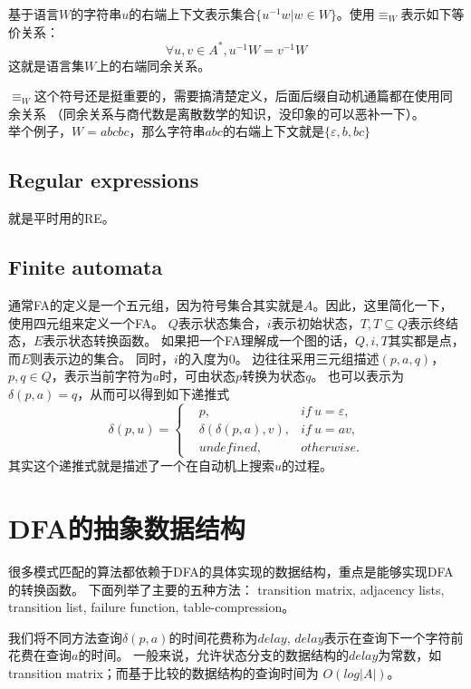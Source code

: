 \documentclass[UTF8]{ctexart}
\theoremstyle{definition}
\theoremstyle{remark}
\numberwithin{equation}{subsection}
\begin{document}
	基于语言$W$的字符串$u$的右端上下文表示集合$\{ u^{-1}w | w \in W \}$。使用$\equiv_W$表示如下等价关系：
	\[
		\forall u,v \in A^*, u^{-1} W = v^{-1} W
	\]
	这就是语言集$W$上的右端同余关系。
	
	$\equiv_W$这个符号还是挺重要的，需要搞清楚定义，后面后缀自动机通篇都在使用同余关系
	（同余关系与商代数是离散数学的知识，没印象的可以恶补一下）。	\\
	举个例子，$W = {abcbc}$，那么字符串$abc$的右端上下文就是$\{ \varepsilon, b, bc \}$
	
	
\subsection{Regular expressions}

	就是平时用的RE。
	
\subsection{Finite automata}
	
	通常FA的定义是一个五元组，因为符号集合其实就是$A$。因此，这里简化一下，使用四元组来定义一个FA。
	$Q$表示状态集合，$i$表示初始状态，$T, T \subseteq Q$表示终结态，$E$表示状态转换函数。
	如果把一个FA理解成一个图的话，$Q, i, T$其实都是点，而$E$则表示边的集合。
	同时，$i$的入度为0。
	边往往采用三元组描述$(p, a, q)$，$p,q \in Q$，表示当前字符为$a$时，可由状态$p$转换为状态$q$。
	也可以表示为$\delta(p, a)=q$，从而可以得到如下递推式
	\[
		\delta(p, u) =
		\left\{
		\begin{aligned}
			&p,		  &if\ u=\varepsilon,	\\
			&\delta(\delta(p, a), v), &if\ u=av,	\\
			&undefined,  &otherwise.
		\end{aligned}
		\right .
	\]
	其实这个递推式就是描述了一个在自动机上搜索$u$的过程。
	
\section{DFA的抽象数据结构}

	很多模式匹配的算法都依赖于DFA的具体实现的数据结构，重点是能够实现DFA的转换函数。
	下面列举了主要的五种方法：
	transition matrix, adjacency lists, transition list, failure function, table-compression。
	
	我们将不同方法查询$\delta(p,a)$的时间花费称为$delay$, $delay$表示在查询下一个字符前花费在查询$a$的时间。
	一般来说，允许状态分支的数据结构的$delay$为常数，如transition matrix；而基于比较的数据结构的查询时间为
	$O(log |A|)$。
	
\end{document}
